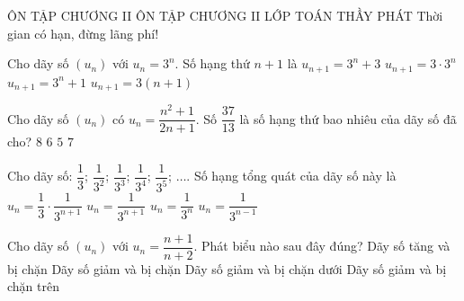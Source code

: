 \newpage
\def\tenchude{ÔN TẬP CHƯƠNG II}
\begin{name}
	{\tenchude}
	{ÔN TẬP CHƯƠNG II}
	{LỚP TOÁN THẦY PHÁT}
	{Thời gian có hạn, đừng lãng phí!}
\end{name}
\TN
\begin{ex}%
	Cho dãy số $(u_n)$ với $u_n=3^n$. Số hạng thứ $n+1$ là
	\choice
	{$u_{n+1}=3^n+3$}
	{\True $u_{n+1}=3\cdot 3^n$}
	{$u_{n+1}=3^n+1$}
	{$u_{n+1}=3(n+1)$}
\end{ex}
\begin{ex}%
	Cho dãy số $(u_n)$ có $u_n=\dfrac{n^2+1}{2n+1}$. Số $\dfrac{37}{13}$ là số hạng thứ bao nhiêu của dãy số đã cho?
	\choice
	{$8$}
	{\True $6$}
	{$5$}
	{$7$}
\end{ex}
\begin{ex}%
	Cho dãy số: $\dfrac{1}{3}$; $\dfrac{1}{3^2}$; $\dfrac{1}{3^3}$; $\dfrac{1}{3^4}$; $\dfrac{1}{3^5}$; $\ldots$. Số hạng tổng quát của dãy số này là
	\choice
	{$u_n=\dfrac{1}{3}\cdot \dfrac{1}{3^{n+1}}$}
	{$u_n=\dfrac{1}{3^{n+1}}$}
	{\True $u_n=\dfrac{1}{3^n}$}
	{$u_n=\dfrac{1}{3^{n-1}}$}
\end{ex}
\begin{ex}%
	Cho dãy số $(u_n)$ với $u_n=\dfrac{n+1}{n+2}$. Phát biểu nào sau đây đúng?
	\choice
	{\True Dãy số tăng và bị chặn}
	{Dãy số giảm và bị chặn}
	{Dãy số giảm và bị chặn dưới}
	{Dãy số giảm và bị chặn trên}
\end{ex}
